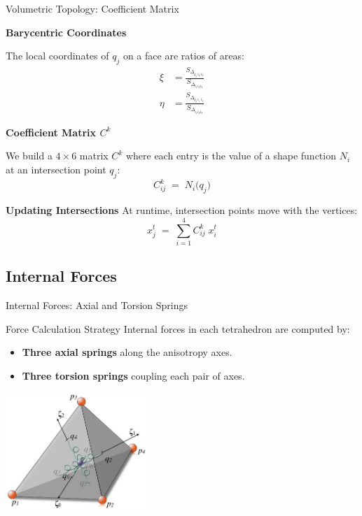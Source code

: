 \documentclass{beamer}
\begin{document}
\begin{frame}[fragile]{Volumetric Topology: Coefficient Matrix}

            \textbf{Barycentric Coordinates}
            
            The local coordinates of $q_j$ on a face are ratios of areas:
            \begin{align*}
                \xi &= \frac{S_{\Delta_{q_j\,i_2\,i_3}}}{S_{\Delta_{i_1i_2i_3}}} \\
                \eta &= \frac{S_{\Delta_{q_j\,i_1\,i_3}}}{S_{\Delta_{i_1i_2i_3}}}
            \end{align*}
            
            \textbf{Coefficient Matrix $C^k$}
            
            We build a $4 \times 6$ matrix $C^k$ where each entry is the value of a shape function $N_i$ at an intersection point $q_j$:
            \[
                C^k_{ij}\;=\;N_i\bigl(q_j\bigr)
            \]

    
    \textbf{Updating Intersections}
    At runtime, intersection points move with the vertices:
    \[
        x^t_j \;=\;\sum_{i=1}^4 C^k_{ij}\;x^t_i
    \]
\end{frame}

\subsection{Internal Forces}

\begin{frame}{Internal Forces: Axial and Torsion Springs}
    \begin{block}{Force Calculation Strategy}
    Internal forces in each tetrahedron are computed by:
    \begin{itemize}
        \item \textbf{Three axial springs} along the anisotropy axes.
        \item \textbf{Three torsion springs} coupling each pair of axes.
    \end{itemize}
    \end{block}
    \begin{center}
        \includegraphics[width=0.4\textwidth]{images/fig2.12.jpg}
    \end{center}
\end{frame}
\end{document}
